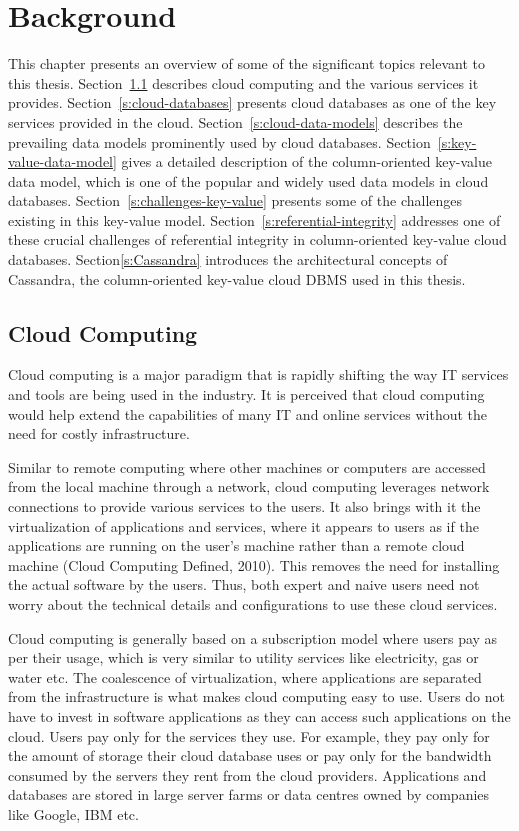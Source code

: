 \chapter{Background} \label{c:background}

This chapter  presents an overview of some of the significant topics relevant to
this thesis. Section~\ref{s:cloudComputing} describes cloud computing and the
various services it provides. Section~\ref{s:cloud-databases} presents cloud
databases as one of the key services provided in the cloud.
Section~\ref{s:cloud-data-models} describes the prevailing data models
prominently used by cloud databases. Section~\ref{s:key-value-data-model} gives a detailed
description of the column-oriented key-value data model, which is one of the
popular and widely used data models in cloud databases.
Section~\ref{s:challenges-key-value} presents some of the challenges existing in
this key-value model.
Section~\ref{s:referential-integrity} addresses one of these crucial challenges
of referential integrity in column-oriented key-value cloud databases.
Section\ref{s:Cassandra} introduces the architectural concepts of Cassandra, the
column-oriented key-value cloud \ac{DBMS} used in this thesis.

\section{Cloud Computing} \label{s:cloudComputing}
Cloud computing is a major paradigm that is rapidly shifting the way \ac{IT}
services and tools are being used in the industry.  It is perceived that cloud
computing would help extend the capabilities of many \ac{IT} and online services
without the need for costly infrastructure. 

Similar to remote computing where other machines or computers are accessed from
the local machine through a network,   cloud computing leverages network
connections to provide various services to the users.  It also brings with it the
virtualization of applications and services,   where it appears to users as if the
applications are running on the user's machine rather than a remote cloud
machine (Cloud Computing Defined,   2010).  This removes the need for installing
the actual software by the users.  Thus,   both expert and naive users need not
worry about the technical details and configurations to use these cloud
services. 

Cloud computing is generally based on a subscription model where users pay as
per their usage,   which is very similar to utility services like electricity,   gas
or water etc.  The coalescence of virtualization,   where applications are
separated from the infrastructure is what makes cloud computing easy to use. 
Users do not have to invest in software applications as they can access such
applications on the cloud.  Users pay only for the services they use.  For
example,   they pay only for the amount of storage their cloud database uses or
pay only for the bandwidth consumed by the servers they rent from the cloud
providers.  Applications and databases are stored in large server farms or data
centres owned by companies like Google,  IBM etc. 

